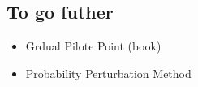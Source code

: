 \documentclass{article}
\begin{document}
\begin{multicols}{2}
\section{To go futher}
\begin{itemize}
\item Grdual Pilote Point (book)
\item Probability Perturbation Method
\end{itemize}





	
	
\end{multicols}
\end{document}
